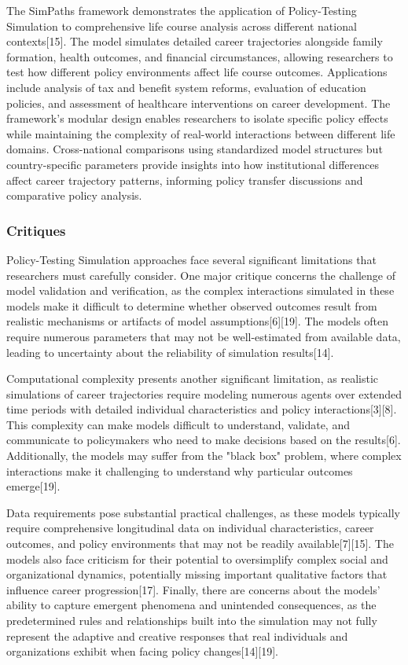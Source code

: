 \documentclass[main.tex]{subfiles}
\begin{document}
The SimPaths framework demonstrates the application of Policy-Testing Simulation to comprehensive life course analysis across different national contexts[15]. The model simulates detailed career trajectories alongside family formation, health outcomes, and financial circumstances, allowing researchers to test how different policy environments affect life course outcomes. Applications include analysis of tax and benefit system reforms, evaluation of education policies, and assessment of healthcare interventions on career development. The framework's modular design enables researchers to isolate specific policy effects while maintaining the complexity of real-world interactions between different life domains. Cross-national comparisons using standardized model structures but country-specific parameters provide insights into how institutional differences affect career trajectory patterns, informing policy transfer discussions and comparative policy analysis.

\subsubsection{Critiques}

Policy-Testing Simulation approaches face several significant limitations that researchers must carefully consider. One major critique concerns the challenge of model validation and verification, as the complex interactions simulated in these models make it difficult to determine whether observed outcomes result from realistic mechanisms or artifacts of model assumptions[6][19]. The models often require numerous parameters that may not be well-estimated from available data, leading to uncertainty about the reliability of simulation results[14].

Computational complexity presents another significant limitation, as realistic simulations of career trajectories require modeling numerous agents over extended time periods with detailed individual characteristics and policy interactions[3][8]. This complexity can make models difficult to understand, validate, and communicate to policymakers who need to make decisions based on the results[6]. Additionally, the models may suffer from the "black box" problem, where complex interactions make it challenging to understand why particular outcomes emerge[19].

Data requirements pose substantial practical challenges, as these models typically require comprehensive longitudinal data on individual characteristics, career outcomes, and policy environments that may not be readily available[7][15]. The models also face criticism for their potential to oversimplify complex social and organizational dynamics, potentially missing important qualitative factors that influence career progression[17]. Finally, there are concerns about the models' ability to capture emergent phenomena and unintended consequences, as the predetermined rules and relationships built into the simulation may not fully represent the adaptive and creative responses that real individuals and organizations exhibit when facing policy changes[14][19].
\end{document}

